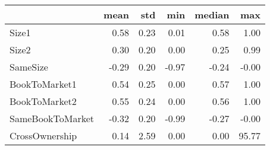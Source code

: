 \begin{tabular}{lrrrrr}
\toprule
{} &  mean &   std &   min &  median &    max \\
\midrule
Size1            &  0.58 &  0.23 &  0.01 &    0.58 &   1.00 \\
Size2            &  0.30 &  0.20 &  0.00 &    0.25 &   0.99 \\
SameSize         & -0.29 &  0.20 & -0.97 &   -0.24 &  -0.00 \\
BookToMarket1    &  0.54 &  0.25 &  0.00 &    0.57 &   1.00 \\
BookToMarket2    &  0.55 &  0.24 &  0.00 &    0.56 &   1.00 \\
SameBookToMarket & -0.32 &  0.20 & -0.99 &   -0.27 &  -0.00 \\
CrossOwnership   &  0.14 &  2.59 &  0.00 &    0.00 &  95.77 \\
\bottomrule
\end{tabular}
